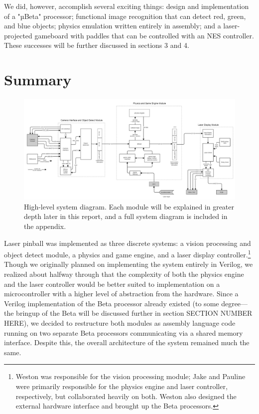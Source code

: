 \documentclass{article}
\begin{document}
We did, however, accomplish several exciting things: design and implementation of a "µBeta" processor; functional image recognition that can detect red, green, and blue objects; physics emulation written entirely in assembly; and a laser-projected gameboard with paddles that can be controlled with an NES controller.  These successes will be further discussed in sections 3 and 4.


\section{Summary} \label{summary}

\begin{figure}[H]
\begin{center}
\includegraphics[width=\textwidth]{block_all} 
\caption{High-level system diagram. Each module will be explained in greater depth later in this report, and a full system diagram is included in the appendix.}
\end{center}
\end{figure}

Laser pinball was implemented as three discrete systems: a vision processing and object detect module, a physics and game engine, and a laser display controller.\footnote{Weston was responsible for the vision processing module; Jake and Pauline were primarily responsible for the physics engine and laser controller, respectively, but collaborated heavily on both. Weston also designed the external hardware interface and brought up the Beta processors.}  Though we originally planned on implementing the system entirely in Verilog, we realized about halfway through that the complexity of both the physics engine and the laser controller would be better suited to implementation on a microcontroller with a higher level of abstraction from the hardware. Since a Verilog implementation of the Beta processor already existed (to some degree—the bringup of the Beta will be discussed further in section SECTION NUMBER HERE), we decided to restructure both modules as assembly language code running on two separate Beta processors communicating via a shared memory interface. Despite this, the overall architecture of the system remained much the same.
\end{document}
